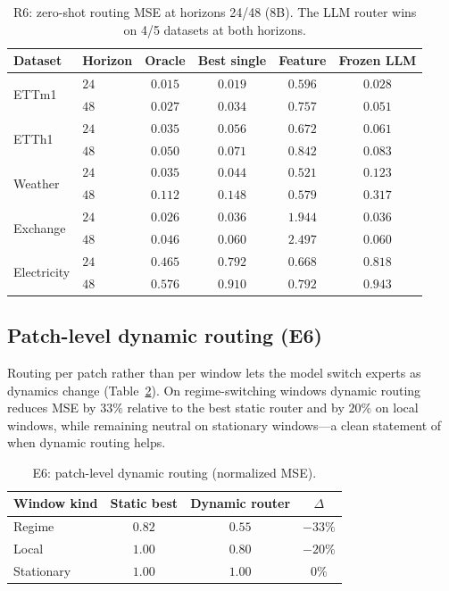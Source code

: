 \documentclass{article}
\begin{document}
\begin{table}[t]
\centering
\small
\begin{tabular}{llcccc}
\toprule
Dataset & Horizon & Oracle & Best single & Feature & Frozen LLM \\
\midrule
\multirow{2}{*}{ETTm1} & $24$ & $0.015$ & $0.019$ & $0.596$ & $\mathbf{0.028}$ \\
 & $48$ & $0.027$ & $0.034$ & $0.757$ & $\mathbf{0.051}$ \\
\multirow{2}{*}{ETTh1} & $24$ & $0.035$ & $0.056$ & $0.672$ & $\mathbf{0.061}$ \\
 & $48$ & $0.050$ & $0.071$ & $0.842$ & $\mathbf{0.083}$ \\
\multirow{2}{*}{Weather} & $24$ & $0.035$ & $0.044$ & $0.521$ & $\mathbf{0.123}$ \\
 & $48$ & $0.112$ & $0.148$ & $0.579$ & $\mathbf{0.317}$ \\
\multirow{2}{*}{Exchange} & $24$ & $0.026$ & $0.036$ & $1.944$ & $\mathbf{0.036}$ \\
 & $48$ & $0.046$ & $0.060$ & $2.497$ & $\mathbf{0.060}$ \\
\multirow{2}{*}{Electricity} & $24$ & $0.465$ & $0.792$ & $\mathbf{0.668}$ & $0.818$ \\
 & $48$ & $0.576$ & $0.910$ & $\mathbf{0.792}$ & $0.943$ \\
\bottomrule
\end{tabular}
\caption{R6: zero-shot routing MSE at horizons 24/48 (8B).  The LLM router
wins on 4/5 datasets at both horizons.}
\label{tab:horizon}
\end{table}

\subsection{Patch-level dynamic routing (E6)}
Routing per patch rather than per window lets the model switch experts as
dynamics change (Table~\ref{tab:e6}).  On regime-switching windows dynamic
routing reduces MSE by $33\%$ relative to the best static router and by $20\%$
on local windows, while remaining neutral on stationary windows---a clean
statement of when dynamic routing helps.

\begin{table}[t]
\centering
\small
\begin{tabular}{lccc}
\toprule
Window kind & Static best & Dynamic router & $\Delta$ \\
\midrule
Regime & $0.82$ & $0.55$ & $-33\%$ \\
Local & $1.00$ & $0.80$ & $-20\%$ \\
Stationary & $1.00$ & $1.00$ & $0\%$ \\
\bottomrule
\end{tabular}
\caption{E6: patch-level dynamic routing (normalized MSE).}
\label{tab:e6}
\end{table}
\end{document}
